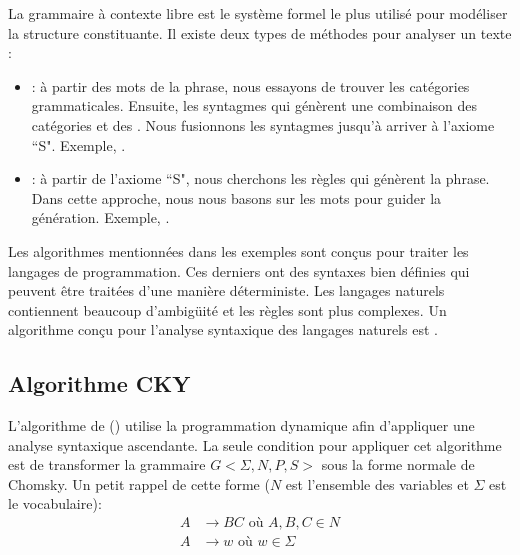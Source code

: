 \documentclass{KodeBook}
\begin{document}
La grammaire à contexte libre est le système formel le plus utilisé pour modéliser la structure constituante.
Il existe deux types de méthodes pour analyser un texte :
\begin{itemize}
	\item {} : à partir des mots de la phrase, nous essayons de trouver les catégories grammaticales. Ensuite, les syntagmes qui génèrent une combinaison des catégories et des . 
	Nous fusionnons les syntagmes jusqu'à arriver à l'axiome ``S".
	Exemple, .
	\item {} : à partir de l'axiome ``S", nous cherchons les règles qui génèrent la phrase. 
	Dans cette approche, nous nous basons sur les mots pour guider la génération.
	Exemple, .
\end{itemize}
Les algorithmes mentionnées dans les exemples sont conçus pour traiter les langages de programmation. 
Ces derniers ont des syntaxes bien définies qui peuvent être traitées d'une manière déterministe. 
Les langages naturels contiennent beaucoup d'ambigüité et les règles sont plus complexes. 
Un algorithme conçu pour l'analyse syntaxique des langages naturels est .

\subsection{Algorithme CKY}

L'algorithme de  () utilise la programmation dynamique afin d'appliquer une analyse syntaxique ascendante. 
La seule condition pour appliquer cet algorithme est de transformer la grammaire $G <\Sigma, N, P, S>$ sous la forme normale de Chomsky. 
Un petit rappel de cette forme ($N$ est l'ensemble des variables et $\Sigma$ est le vocabulaire): 
\begin{align*}
	A & \rightarrow  B C \text{ où } A, B, C \in N\\
	A & \rightarrow w \text{ où } w \in \Sigma
\end{align*}
\end{document}

